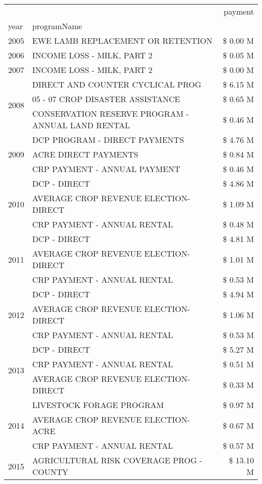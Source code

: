 \begin{tabular}{llr}
\toprule
 &  & payment \\
year & programName &  \\
\midrule
2005 & EWE LAMB REPLACEMENT OR RETENTION & \$ 0.00 M \\
\cline{1-3}
2006 & INCOME LOSS - MILK, PART 2 & \$ 0.05 M \\
\cline{1-3}
2007 & INCOME LOSS - MILK, PART 2 & \$ 0.00 M \\
\cline{1-3}
\multirow[t]{3}{*}{2008} & DIRECT AND COUNTER CYCLICAL PROG & \$ 6.15 M \\
 & 05 - 07 CROP DISASTER ASSISTANCE & \$ 0.65 M \\
 & CONSERVATION RESERVE PROGRAM - ANNUAL LAND RENTAL & \$ 0.46 M \\
\cline{1-3}
\multirow[t]{3}{*}{2009} & DCP PROGRAM - DIRECT PAYMENTS & \$ 4.76 M \\
 & ACRE DIRECT PAYMENTS & \$ 0.84 M \\
 & CRP PAYMENT - ANNUAL PAYMENT & \$ 0.46 M \\
\cline{1-3}
\multirow[t]{3}{*}{2010} & DCP - DIRECT & \$ 4.86 M \\
 & AVERAGE CROP REVENUE ELECTION-DIRECT & \$ 1.09 M \\
 & CRP PAYMENT - ANNUAL RENTAL & \$ 0.48 M \\
\cline{1-3}
\multirow[t]{3}{*}{2011} & DCP - DIRECT & \$ 4.81 M \\
 & AVERAGE CROP REVENUE ELECTION-DIRECT & \$ 1.01 M \\
 & CRP PAYMENT - ANNUAL RENTAL & \$ 0.53 M \\
\cline{1-3}
\multirow[t]{3}{*}{2012} & DCP - DIRECT & \$ 4.94 M \\
 & AVERAGE CROP REVENUE ELECTION-DIRECT & \$ 1.06 M \\
 & CRP PAYMENT - ANNUAL RENTAL & \$ 0.53 M \\
\cline{1-3}
\multirow[t]{3}{*}{2013} & DCP - DIRECT & \$ 5.27 M \\
 & CRP PAYMENT - ANNUAL RENTAL & \$ 0.51 M \\
 & AVERAGE CROP REVENUE ELECTION-DIRECT & \$ 0.33 M \\
\cline{1-3}
\multirow[t]{3}{*}{2014} & LIVESTOCK FORAGE PROGRAM & \$ 0.97 M \\
 & AVERAGE CROP REVENUE ELECTION-ACRE & \$ 0.67 M \\
 & CRP PAYMENT - ANNUAL RENTAL & \$ 0.57 M \\
\cline{1-3}
\multirow[t]{3}{*}{2015} & AGRICULTURAL RISK COVERAGE PROG - COUNTY & \$ 13.10 M \\

\end{tabular}
